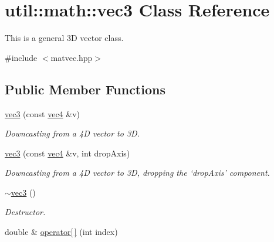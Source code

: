 \hypertarget{classutil_1_1math_1_1vec3}{\section{util\-:\-:math\-:\-:vec3 \-Class \-Reference}
\label{classutil_1_1math_1_1vec3}
}


\-This is a general 3\-D vector class.  




{\ttfamily \#include $<$matvec.\-hpp$>$}

\subsection*{\-Public \-Member \-Functions}
\begin{DoxyCompactItemize}
\item 
\hypertarget{classutil_1_1math_1_1vec3_aa76ecb2e2e4169d0719e70d928cbb9f5}{\hyperlink{classutil_1_1math_1_1vec3_aa76ecb2e2e4169d0719e70d928cbb9f5}{vec3} (const \hyperlink{classutil_1_1math_1_1vec4}{vec4} \&v)}\label{classutil_1_1math_1_1vec3_aa76ecb2e2e4169d0719e70d928cbb9f5}

\begin{DoxyCompactList}\small\item\em \-Downcasting from a 4\-D vector to 3\-D. \end{DoxyCompactList}\item 
\hypertarget{classutil_1_1math_1_1vec3_ac1432a40730a7919dddecbb5042e4cee}{\hyperlink{classutil_1_1math_1_1vec3_ac1432a40730a7919dddecbb5042e4cee}{vec3} (const \hyperlink{classutil_1_1math_1_1vec4}{vec4} \&v, int drop\-Axis)}\label{classutil_1_1math_1_1vec3_ac1432a40730a7919dddecbb5042e4cee}

\begin{DoxyCompactList}\small\item\em \-Downcasting from a 4\-D vector to 3\-D, dropping the `drop\-Axis' component. \end{DoxyCompactList}\item 
\hypertarget{classutil_1_1math_1_1vec3_af8045fb15a617d99b9ac76c6af04f6c8}{\hyperlink{classutil_1_1math_1_1vec3_af8045fb15a617d99b9ac76c6af04f6c8}{$\sim$vec3} ()}\label{classutil_1_1math_1_1vec3_af8045fb15a617d99b9ac76c6af04f6c8}

\begin{DoxyCompactList}\small\item\em \-Destructor. \end{DoxyCompactList}\item 
\hypertarget{classutil_1_1math_1_1vec3_aaf6301c10fd53827c56a481703202d1e}{double \& \hyperlink{classutil_1_1math_1_1vec3_aaf6301c10fd53827c56a481703202d1e}{operator\mbox{[}$\,$\mbox{]}} (int index)}\label{classutil_1_1math_1_1vec3_aaf6301c10fd53827c56a481703202d1e}


\end{DoxyCompactItemize}

